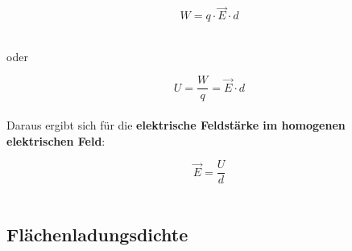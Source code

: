 \documentclass[a4paper]{article}
\begin{document}
\Large$$W = q \cdot \vec{E} \cdot d$$\normalsize\\

\begin{center}
	oder
\end{center}
\Large$$U = \dfrac{W}{q} = \vec{E} \cdot d$$\normalsize\\

Daraus ergibt sich für die \textbf{elektrische Feldstärke im homogenen elektrischen Feld}:

\Large$$\vec{E} = \dfrac{U}{d}$$\normalsize\\



\subsection{Flächenladungsdichte}
\end{document}
